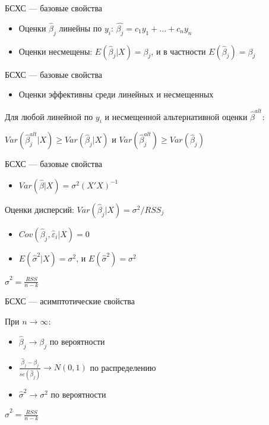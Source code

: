 \documentclass[ignorenonframetext,]{beamer}
\begin{document}
\begin{frame}{БСХС --- базовые свойства}

\begin{itemize}
\item
  Оценки $\hat{\beta}_j$ линейны по $y_i$:
  $\hat{\beta_j}=c_1 y_1 + ... + c_n y_n$
\item
  Оценки несмещены: $E(\hat{\beta}_j |X )=\beta_j$, и в частности
  $E(\hat{\beta}_j)=\beta_j$
\end{itemize}

\end{frame}

\begin{frame}{БСХС --- базовые свойства}

\begin{itemize}
\itemsep1pt\parskip0pt
\item
  Оценки эффективны среди линейных и несмещенных
\end{itemize}

Для любой линейной по $y_i$ и несмещенной альтернативной оценки
$\hat{\beta}^{alt}$:

$Var(\hat{\beta}_j^{alt} | X)\geq Var(\hat{\beta}_j | X)$ и
$Var(\hat{\beta}_j^{alt} )\geq Var(\hat{\beta}_j )$

\end{frame}

\begin{frame}{БСХС --- базовые свойства}

\begin{itemize}
\itemsep1pt\parskip0pt
\item
  $Var(\hat{\beta} | X )=\sigma^2 (X'X)^{-1}$
\end{itemize}

Оценки дисперсий: $Var(\hat{\beta}_j| X)=\sigma^2/RSS_j$

\begin{itemize}
\itemsep1pt\parskip0pt
\item
  $Cov(\hat{\beta}_j,\hat{\varepsilon}_i | X)=0$
\item
  $E(\hat{\sigma}^2 |X ) = \sigma^2$, и $E(\hat{\sigma}^2 ) = \sigma^2$
\end{itemize}

$\hat{\sigma}^2=\frac{RSS}{n-k}$

\end{frame}

\begin{frame}{БСХС --- асимптотические свойства}

При $n\to \infty$:

\begin{itemize}
\itemsep1pt\parskip0pt
\item
  $\hat{\beta}_j \to \beta_j$ по вероятности
\item
  $\frac{\hat{\beta}_j-\beta_j}{se(\hat{\beta}_j)} \to N(0,1)$ по
  распределению
\item
  $\hat{\sigma}^2 \to \sigma^2 $ по вероятности
\end{itemize}

$\hat{\sigma}^2=\frac{RSS}{n-k}$

\end{frame}
\end{document}
